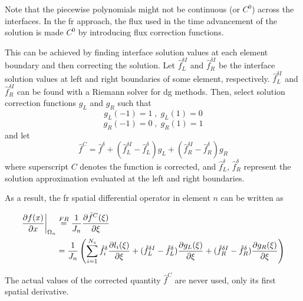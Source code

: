 Note that the piecewise polynomials might not be continuous (or $C^0$) across the interfaces. In the 
\gls{fr} approach, the flux used in the time advancement of the solution is made $C^0$ 
by introducing flux correction functions.

This can be achieved by finding interface solution values at each element boundary and then correcting the 
solution. Let $\hat{f}_L^{\delta I}$ and $\hat{f}_R^{\delta I}$ be the interface solution values at left and right 
boundaries of some element, respectively. $\hat{f}_L^{\delta I}$ and $\hat{f}_R^{\delta I}$ can be found with a Riemann solver for \gls{dg} methods\cite{hesthaven2007nodal}. Then, select solution correction functions $g_L$ and 
$g_R$ such 
that
\begin{equation}\label{eq:condition}
g_L(-1) = 1 \;,\; g_L(1) = 0
\end{equation}
\begin{equation}
g_R(-1) = 0 \;,\; g_R(1) = 1
\end{equation}
and let
\begin{equation}
\hat{f}^C = \hat{f}^\delta + (\hat{f}^{\delta I}_L - \hat{f}^\delta_L) g_L + (\hat{f}^{\delta I}_R 
- \hat{f}^\delta_R) g_R
\end{equation}
where superscript $C$ denotes the function is corrected, and $\hat{f}^\delta_L$, $\hat{f}^\delta_R$ 
represent the solution approximation evaluated at the left and right boundaries.

As a result, the \gls{fr} spatial differential operator in element $n$ can be written as

\begin{equation}
\begin{aligned}
{\frac{\partial f(x)}{\partial x}}\bigg|_{\Omega_n} &\stackrel{FR}{=} \frac{1}{J_n}{\frac{\partial \hat{f}^C(\xi)}{\partial \xi}}\\ &= \frac{1}{J_n}\left(\sum_{i=1}^{N_s} \hat{f}_i^\delta {\frac{\partial l_i(\xi)}{\partial \xi}} + (\hat{f}^{\delta I}_L - \hat{f}^\delta_L) {\frac{\partial g_L(\xi)}{\partial \xi}} + (\hat{f}^{\delta I}_R 
- \hat{f}^\delta_R) {\frac{\partial g_R(\xi)}{\partial \xi}}\right)
\end{aligned}
\end{equation}

The actual values of the corrected quantity $\hat{f}^C$ are never used, only its first spatial derivative.


